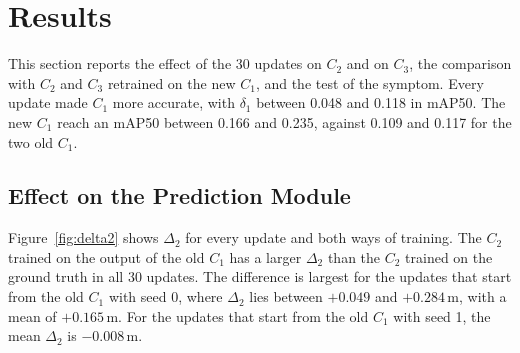 \documentclass[11pt,a4paper]{article}
\begin{document}
\section{Results}

This section reports the effect of the 30 updates on $C_2$ and on $C_3$, the
comparison with $C_2$ and $C_3$ retrained on the new $C_1$, and the test of
the symptom. Every update made $C_1$ more accurate, with $\delta_1$ between
0.048 and 0.118 in mAP50. The new $C_1$ reach an mAP50 between 0.166 and
0.235, against 0.109 and 0.117 for the two old $C_1$.

\subsection{Effect on the Prediction Module}

Figure~\ref{fig:delta2} shows $\Delta_2$ for every update and both ways of
training. The $C_2$ trained on the output of the old $C_1$ has a larger
$\Delta_2$ than the $C_2$ trained on the ground truth in all 30 updates. The
difference is largest for the updates that start from the old $C_1$ with seed
0, where $\Delta_2$ lies between $+0.049$ and $+0.284$\,m, with a mean of
$+0.165$\,m. For the updates that start from the old $C_1$ with seed 1, the
mean $\Delta_2$ is $-0.008$\,m.
\end{document}
